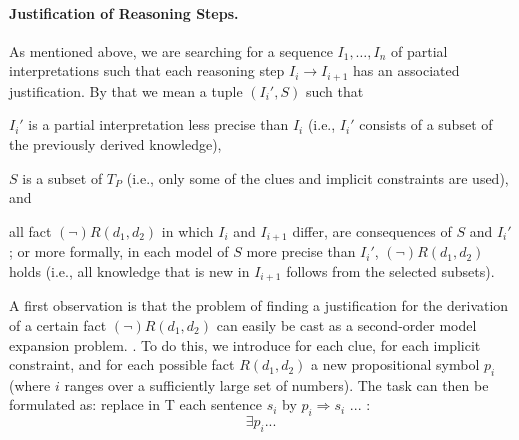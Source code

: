\paragraph{Justification of Reasoning Steps.}
As mentioned above, we are searching for a sequence $I_1,\dots, I_n$ of partial interpretations such that each reasoning step $I_i\to I_{i+1}$ has an associated justification. By that we mean a tuple $(I_i',S)$ such that  
\begin{compactitem}
	\item $I_i'$ is a partial interpretation less precise than $I_i$ (i.e., $I_i'$ consists of a subset of the previously derived knowledge), 
	\item $S$ is a subset of $T_P$ (i.e., only some of the clues and implicit constraints are used), and 
	\item all fact $(\lnot) R(d_1,d_2)$ in which $I_i$ and $I_{i+1}$ differ, are consequences of $S$ and $I_i'$; or more formally, in each model of $S$ more precise than $I_i'$, $(\lnot) R(d_1,d_2)$ holds (i.e., all knowledge that is new in $I_{i+1}$ follows from the selected subsets).
\end{compactitem}
A first observation is that the problem of finding a justification for the derivation of a certain fact $(\lnot) R(d_1,d_2)$ can easily be cast as a second-order model expansion problem. . 
To do this, we introduce for each clue, for each implicit constraint, and for each possible fact $R(d_1,d_2)$ a new propositional symbol $p_i$ (where $i$ ranges over a sufficiently large set of numbers). 
The task can then be formulated as: replace in T each sentence $s_i$ by $p_i\Rightarrow s_i$ ... : 
\[\exists p_i... \]




